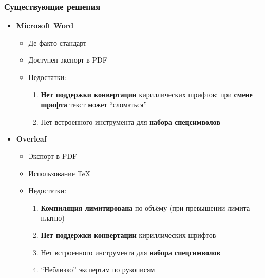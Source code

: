 \documentclass
  [ russian
  , aspectratio=1610 %
  ] {beamer}
\begin{document}
\begin{frame}
    \frametitle{Существующие решения}

    \begin{itemize}
        \item \textbf{Microsoft Word}
        \begin{itemize}
            \item Де-факто стандарт
            \item Доступен экспорт в PDF
            \item Недостатки:
            \begin{enumerate}
                \item \textbf{Нет поддержки конвертации} кириллических шрифтов: при \textbf{смене шрифта} текст может \enquote{сломаться}
                \item Нет встроенного инструмента для \textbf{набора спецсимволов}
            \end{enumerate}
        \end{itemize}
        \item \textbf{Overleaf}
        \begin{itemize}
            \item Экспорт в PDF
            \item Использование TeX
            \item Недостатки:
            \begin{enumerate}
                \item \textbf{Компиляция лимитирована} по объёму (при превышении лимита~--- платно)
                \item \textbf{Нет поддержки конвертации} кириллических шрифтов
                \item Нет встроенного инструмента для \textbf{набора спецсимволов}
                \item \enquote{Неблизко} экспертам по рукописям
            \end{enumerate}
        \end{itemize}
    \end{itemize}
\end{frame}
\end{document}
